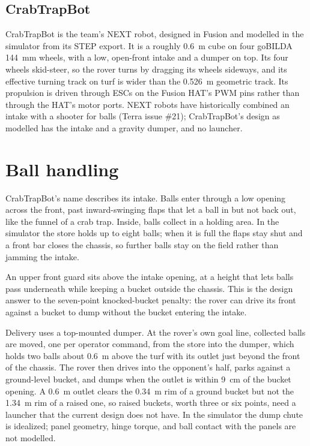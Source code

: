 \subsection{CrabTrapBot}

CrabTrapBot is the team's NEXT robot, designed in Fusion and modelled in the simulator from its STEP export.
It is a roughly 0.6~m cube on four goBILDA 144~mm wheels, with a low, open-front intake and a dumper on top.
Its four wheels skid-steer, so the rover turns by dragging its wheels sideways, and its effective turning track on turf is wider than the 0.526~m geometric track.
Its propulsion is driven through ESCs on the Fusion HAT's PWM pins rather than through the HAT's motor ports.
NEXT robots have historically combined an intake with a shooter for balls (Terra issue \#21); CrabTrapBot's design as modelled has the intake and a gravity dumper, and no launcher.

\section{Ball handling}
\label{sec:rover-balls}

CrabTrapBot's name describes its intake.
Balls enter through a low opening across the front, past inward-swinging flaps that let a ball in but not back out, like the funnel of a crab trap.
Inside, balls collect in a holding area.
In the simulator the store holds up to eight balls; when it is full the flaps stay shut and a front bar closes the chassis, so further balls stay on the field rather than jamming the intake.

An upper front guard sits above the intake opening, at a height that lets balls pass underneath while keeping a bucket outside the chassis.
This is the design answer to the seven-point knocked-bucket penalty: the rover can drive its front against a bucket to dump without the bucket entering the intake.

Delivery uses a top-mounted dumper.
At the rover's own goal line, collected balls are moved, one per operator command, from the store into the dumper, which holds two balls about 0.6~m above the turf with its outlet just beyond the front of the chassis.
The rover then drives into the opponent's half, parks against a ground-level bucket, and dumps when the outlet is within 9~cm of the bucket opening.
A 0.6~m outlet clears the 0.34~m rim of a ground bucket but not the 1.34~m rim of a raised one, so raised buckets, worth three or six points, need a launcher that the current design does not have.
In the simulator the dump chute is idealized; panel geometry, hinge torque, and ball contact with the panels are not modelled.

